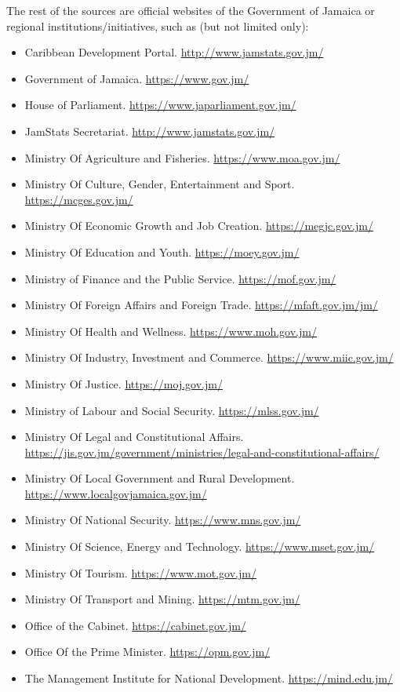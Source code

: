 \documentclass[
  10pt,
]{book}
\begin{document}
The rest of the sources are official websites of the Government of Jamaica or regional institutions/initiatives, such as (but not limited only):

\begin{itemize}
\item
  Caribbean Development Portal. \url{http://www.jamstats.gov.jm/}
\item
  Government of Jamaica. \url{https://www.gov.jm/}
\item
  House of Parliament. \url{https://www.japarliament.gov.jm/}
\item
  JamStats Secretariat. \url{http://www.jamstats.gov.jm/}
\item
  Ministry Of Agriculture and Fisheries. \url{https://www.moa.gov.jm/}
\item
  Ministry Of Culture, Gender, Entertainment and Sport. \url{https://mcges.gov.jm/}
\item
  Ministry Of Economic Growth and Job Creation. \url{https://megjc.gov.jm/}
\item
  Ministry Of Education and Youth. \url{https://moey.gov.jm/}
\item
  Ministry of Finance and the Public Service. \url{https://mof.gov.jm/}
\item
  Ministry Of Foreign Affairs and Foreign Trade. \url{https://mfaft.gov.jm/jm/}
\item
  Ministry Of Health and Wellness. \url{https://www.moh.gov.jm/}
\item
  Ministry Of Industry, Investment and Commerce. \url{https://www.miic.gov.jm/}
\item
  Ministry Of Justice. \url{https://moj.gov.jm/}
\item
  Ministry of Labour and Social Security. \url{https://mlss.gov.jm/}
\item
  Ministry Of Legal and Constitutional Affairs. \url{https://jis.gov.jm/government/ministries/legal-and-constitutional-affairs/}
\item
  Ministry Of Local Government and Rural Development. \url{https://www.localgovjamaica.gov.jm/}
\item
  Ministry Of National Security. \url{https://www.mns.gov.jm/}
\item
  Ministry Of Science, Energy and Technology. \url{https://www.mset.gov.jm/}
\item
  Ministry Of Tourism. \url{https://www.mot.gov.jm/}
\item
  Ministry Of Transport and Mining. \url{https://mtm.gov.jm/}
\item
  Office of the Cabinet. \url{https://cabinet.gov.jm/}
\item
  Office Of the Prime Minister. \url{https://opm.gov.jm/}
\item
  The Management Institute for National Development. \url{https://mind.edu.jm/}
\end{itemize}
\end{document}
